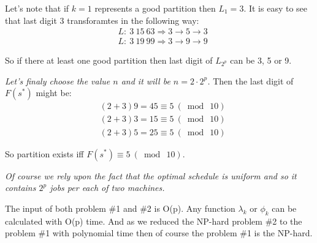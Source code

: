 \documentclass{amsart}
\begin{document}
Let's note that if $k=1$ represents a good partition then $L_1=3$.
It is easy to see that last digit 3 transforamtes in the following way:
\begin{align*}
  & L:\ 3\ 15\ 63 \Rightarrow 3 \to 5 \to 3 \\
  & L:\ 3\ 19\ 99 \Rightarrow 3 \to 9 \to 9
\end{align*}

So if there at least one good partition
then last digit of $L_{2^p}$ can be 3, 5 or 9.

{\it Let's finaly choose the value $n$ and it will be $n=2\cdot2^p$.}
Then the last digit of $F(s^*)$ might be:
\begin{align*}
  & (2 + 3) 9 = 45 \equiv 5\ (\bmod\ 10) \\
  & (2 + 3) 3 = 15 \equiv 5\ (\bmod\ 10) \\
  & (2 + 3) 5 = 25 \equiv 5\ (\bmod\ 10)
\end{align*}

So partition exists iff $F(s^*) \equiv 5\ (\bmod\ 10)$.

{\it
  Of course we rely upon the fact that the optimal schedule is uniform
  and so it contains $2^p$ jobs per each of two machines.
}

The input of both problem \#1 and \#2 is O(p). Any function $\lambda_k$
or $\phi_k$ can be calculated with O(p) time.
And as we reduced the NP-hard problem \#2 to the problem \#1
with polynomial time then of course the problem \#1 is the NP-hard.
\end{document}
